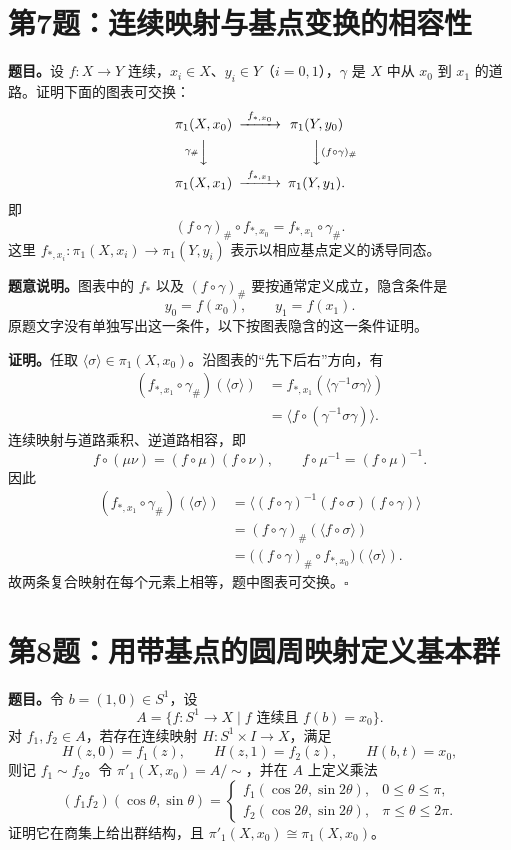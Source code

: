 \documentclass[UTF8,11pt,a4paper]{ctexart}
\newcommand{\pc}[1]{\langle #1\rangle}
\newcommand{\pf}{\par\noindent\textbf{证明。}}
\newcommand{\done}{\hfill\(\square\)\par}
\begin{document}
\clearpage
\section*{第7题：连续映射与基点变换的相容性}
\textbf{题目。}设 \(f:X\to Y\) 连续，\(x_i\in X\)、\(y_i\in Y\)（\(i=0,1\)），\(\gamma\) 是 \(X\) 中从 \(x_0\) 到 \(x_1\) 的道路。证明下面的图表可交换：
\[
\begin{CD}
 \pi_1(X,x_0) @>{f_{*,x_0}}>> \pi_1(Y,y_0)\\
 @V{\gamma_\#}VV @VV{(f\circ\gamma)_\#}V\\
 \pi_1(X,x_1) @>{f_{*,x_1}}>> \pi_1(Y,y_1).
\end{CD}
\]
即
\[
 (f\circ\gamma)_\#\circ f_{*,x_0}
 =f_{*,x_1}\circ\gamma_\#.
\]
这里 \(f_{*,x_i}:\pi_1(X,x_i)\to\pi_1(Y,y_i)\) 表示以相应基点定义的诱导同态。

\noindent\textbf{题意说明。}图表中的 \(f_*\) 以及 \((f\circ\gamma)_\#\) 要按通常定义成立，隐含条件是
\[
 y_0=f(x_0),\qquad y_1=f(x_1).
\]
原题文字没有单独写出这一条件，以下按图表隐含的这一条件证明。

\pf 任取 \(\pc{\sigma}\in\pi_1(X,x_0)\)。沿图表的“先下后右”方向，有
\[
\begin{aligned}
 (f_{*,x_1}\circ\gamma_\#)(\pc{\sigma})
 &=f_{*,x_1}(\pc{\gamma^{-1}\sigma\gamma})\\
 &=\pc{f\circ(\gamma^{-1}\sigma\gamma)}.
\end{aligned}
\]
连续映射与道路乘积、逆道路相容，即
\[
 f\circ(\mu\nu)=(f\circ\mu)(f\circ\nu),
 \qquad f\circ\mu^{-1}=(f\circ\mu)^{-1}.
\]
因此
\[
\begin{aligned}
 (f_{*,x_1}\circ\gamma_\#)(\pc{\sigma})
 &=\pc{(f\circ\gamma)^{-1}(f\circ\sigma)(f\circ\gamma)}\\
 &=(f\circ\gamma)_\#(\pc{f\circ\sigma})\\
 &=\bigl((f\circ\gamma)_\#\circ f_{*,x_0}\bigr)(\pc{\sigma}).
\end{aligned}
\]
故两条复合映射在每个元素上相等，题中图表可交换。\done

\clearpage
\section*{第8题：用带基点的圆周映射定义基本群}
\textbf{题目。}令 \(b=(1,0)\in S^1\)，设
\[
 A=\{f:S^1\to X\mid f\text{ 连续且 }f(b)=x_0\}.
\]
对 \(f_1,f_2\in A\)，若存在连续映射 \(H:S^1\times I\to X\)，满足
\[
 H(z,0)=f_1(z),\qquad H(z,1)=f_2(z),
 \qquad H(b,t)=x_0,
\]
则记 \(f_1\sim f_2\)。令 \(\pi'_1(X,x_0)=A/{\sim}\)，并在 \(A\) 上定义乘法
\[
 (f_1f_2)(\cos\theta,\sin\theta)=
 \begin{cases}
 f_1(\cos2\theta,\sin2\theta),&0\leq\theta\leq\pi,\\
 f_2(\cos2\theta,\sin2\theta),&\pi\leq\theta\leq2\pi.
 \end{cases}
\]
证明它在商集上给出群结构，且 \(\pi'_1(X,x_0)\cong\pi_1(X,x_0)\)。
\end{document}
